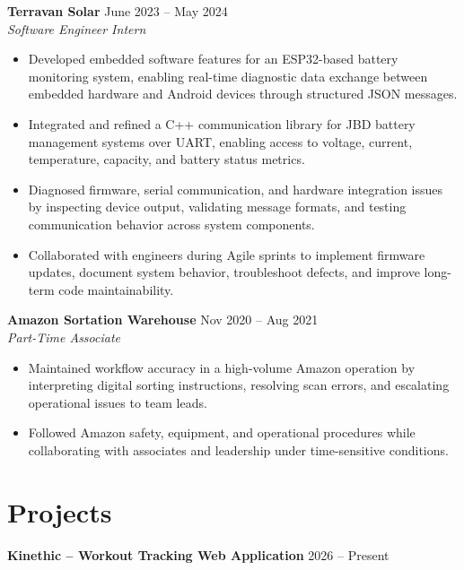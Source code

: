 \documentclass[a4paper,10pt]{article}
\newcommand{\dateright}[1]{%
  \hfill{\small\textnormal{#1}}%
}
\begin{document}
\textbf{Terravan Solar}
\dateright{June 2023 -- May 2024}\\[-1pt]
\textit{Software Engineer Intern}

\begin{itemize}
  \item Developed embedded software features for an ESP32-based battery monitoring system, enabling real-time diagnostic data exchange between embedded hardware and Android devices through structured JSON messages.
  
  \item Integrated and refined a C++ communication library for JBD battery management systems over UART, enabling access to voltage, current, temperature, capacity, and battery status metrics.
  
  \item Diagnosed firmware, serial communication, and hardware integration issues by inspecting device output, validating message formats, and testing communication behavior across system components.
  
  \item Collaborated with engineers during Agile sprints to implement firmware updates, document system behavior, troubleshoot defects, and improve long-term code maintainability.
\end{itemize}

\vspace{2pt}

\textbf{Amazon Sortation Warehouse}
\dateright{Nov 2020 -- Aug 2021}\\[-1pt]
\textit{Part-Time Associate}

\begin{itemize}
  \item Maintained workflow accuracy in a high-volume Amazon operation by interpreting digital sorting instructions, resolving scan errors, and escalating operational issues to team leads.
  
  \item Followed Amazon safety, equipment, and operational procedures while collaborating with associates and leadership under time-sensitive conditions.
\end{itemize}

\section*{Projects}

\textbf{Kinethic -- Workout Tracking Web Application}
\dateright{2026 -- Present}
\end{document}
